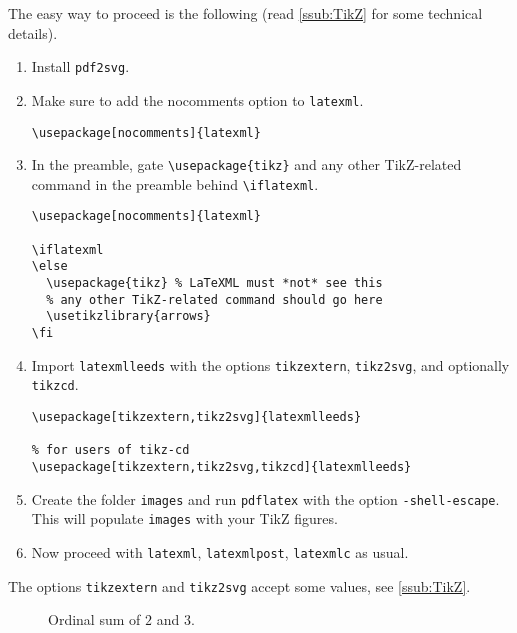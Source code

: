 \documentclass[a4paper]{article}
\def\ltxinline{\lstinline[style=latexml,frame=none]}
\theoremstyle{definition}
\begin{document}
The easy way to proceed is the following (read \autoref{ssub:TikZ} for some technical details).
\begin{enumerate}
  \item Install \verb|pdf2svg|.
  \item Make sure to add the nocomments option to \verb|latexml|.
  \begin{lstlisting}[style=latexml]
\usepackage[nocomments]{latexml}
  \end{lstlisting}
  \item In the preamble, gate \ltxinline|\usepackage{tikz}| and any other TikZ-related command in the preamble behind \ltxinline|\iflatexml|.
  \begin{lstlisting}[style=latexml]
% make sure to add the nocomments option to latexml
\usepackage[nocomments]{latexml}

\iflatexml
\else
  \usepackage{tikz} % LaTeXML must *not* see this
  % any other TikZ-related command should go here
  \usetikzlibrary{arrows}
\fi
  \end{lstlisting}
  \item  Import \ltxinline|latexmlleeds| with the options \ltxinline|tikzextern|, \ltxinline|tikz2svg|, and optionally \ltxinline|tikzcd|.
  \begin{lstlisting}[style=latexml]
% for most users
\usepackage[tikzextern,tikz2svg]{latexmlleeds}

% for users of tikz-cd
\usepackage[tikzextern,tikz2svg,tikzcd]{latexmlleeds}
  \end{lstlisting}
  \item Create the folder \verb|images| and run \verb|pdflatex| with the option \verb|-shell-escape|. This will populate \verb|images| with your TikZ figures.
  \item Now proceed with \verb|latexml|, \verb|latexmlpost|, \verb|latexmlc| as usual.
\end{enumerate}

The options \verb|tikzextern| and \verb|tikz2svg| accept some values, see \autoref{ssub:TikZ}.

\begin{figure}
  \begin{center}
  \end{center}
  \caption{Ordinal sum of $2$ and $3$.}
  \label{fig:tikz-example}
\end{figure}
\end{document}
